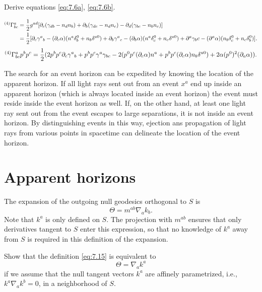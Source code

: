 \begin{exercise}
Derive equations \eqref{eq:7.6a}, \eqref{eq:7.6b}.

\begin{align}
	{}^{(4)} \Gamma^a_{bc} &= \frac{1}{2}g^{ad} [\partial_c (\gamma_{db} - n_d n_b) + \partial_b (\gamma_{dc} - n_d n_c) - \partial_d (\gamma_{bc} - n_b n_c)]\\
	&= \frac{1}{2}[\partial_c \gamma^a{}_b - (\partial_c \alpha) (n^a \delta^0_b + n_b \delta^{a0}) + \partial_b \gamma^a{}_c - (\partial_b \alpha)(n^a \delta^0_c + n_c \delta^{a0}) + \partial^a \gamma_bc - (\partial^a \alpha)(n_b \delta^0_c + n_c \delta^0_b)] .
\end{align}
\begin{equation}
	{}^{(4)} \Gamma^a_{bc}p^bp^c = \frac{1}{2}(2p^bp^c\partial_c \gamma^a{}_b+p^bp^c\gamma^a\gamma_{bc} - 2(p^0p^c(\partial_c\alpha)n^a + p^bp^c(\partial_c\alpha)n_b\delta^{a0})+2\alpha (p^0)^2(\partial_a\alpha)).
\end{equation}

\end{exercise}

The search for an event horizon can be expedited by knowing the location of the apparent horizon. If all light rays sent out from an event $x^a$ end up inside an apparent horizon (which is always located inside an event horizon) the event must reside inside the event horizon as well. If, on the other hand, at least one light ray sent out from the event escapes to large separations, it is not inside an event horizon. By distinguishing events in this way, ejection ans propagation of light rays from various points in spacetime can delineate the location of the event horizon.


\section{Apparent horizons}

The expansion of the outgoing null geodesics orthogonal to $S$ is
\begin{equation}
	\label{eq:7.15}
	\Theta = m^{ab} \nabla_a k_b.
\end{equation}
Note that $k^a$ is only defined on $S$. The projection with $m^{ab}$ ensures that only derivatives tangent to $S$ enter this expression, so that no knowledge of $k^a$ away from $S$ is required in this definition of the expansion.

\begin{exercise}
Show that the definition \eqref{eq:7.15} is equivalent to
\begin{equation}
	\label{eq:7.16}
\Theta = \nabla_a k^a
\end{equation}
if we assume that the null tangent vectors $k^a$ are affinely parametrized, i.e., $k^a\nabla_a k^b=0$, in a neighborhood of $S$.
\end{exercise}

